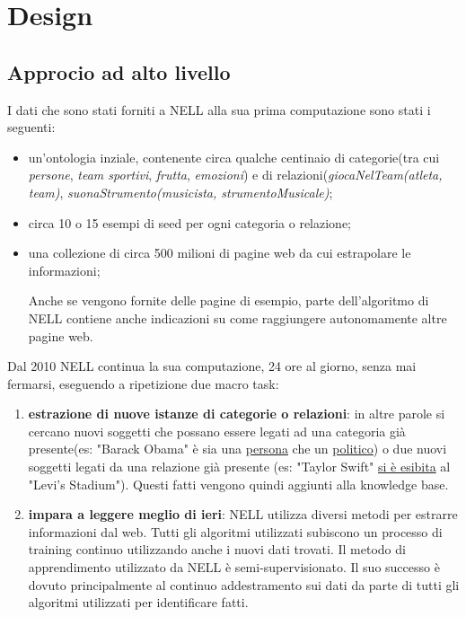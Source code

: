 \section{Design}
\subsection{Approcio ad alto livello}

I dati che sono stati forniti a NELL alla sua prima computazione sono stati i seguenti:
\begin{itemize}
    \item un'ontologia inziale, contenente circa qualche centinaio di categorie(tra cui \textit{persone}, \textit{team sportivi}, \textit{frutta}, \textit{emozioni}) e di relazioni(\textit{giocaNelTeam(atleta, team)}, \textit{suonaStrumento(musicista, strumentoMusicale)};
    \item circa 10 o 15 esempi di seed per ogni categoria o relazione;
    \item una collezione di circa 500 milioni di pagine web da cui estrapolare le informazioni;
    \begin{info}
        Anche se vengono fornite delle pagine di esempio, parte dell'algoritmo di NELL contiene anche indicazioni su come raggiungere autonomamente altre pagine web.
    \end{info}
\end{itemize}

\noindent Dal 2010 NELL continua la sua computazione, 24 ore al giorno, senza mai fermarsi, eseguendo a ripetizione due macro task:
\begin{enumerate}
    \item \textbf{estrazione di nuove istanze di categorie o relazioni}: in altre parole si cercano nuovi soggetti che possano essere legati ad una categoria già presente(es: "Barack Obama" è sia una \underline{persona} che un \underline{politico}) o due nuovi soggetti legati da una relazione già presente (es: "Taylor Swift" \underline{si è esibita} al "Levi's Stadium"). Questi fatti vengono quindi aggiunti alla knowledge base.
    \item \textbf{impara a leggere meglio di ieri}: NELL utilizza diversi metodi per estrarre informazioni dal web. Tutti gli algoritmi utilizzati subiscono un processo di training continuo utilizzando anche i nuovi dati trovati. Il metodo di apprendimento utilizzato da NELL è semi-supervisionato. Il suo successo è dovuto principalmente al continuo addestramento sui dati da parte di tutti gli algoritmi utilizzati per identificare fatti.
\end{enumerate}

\newpage